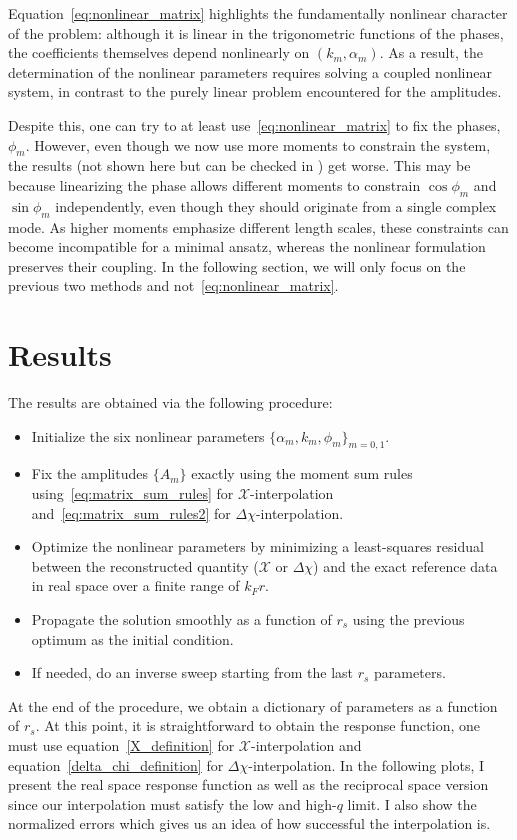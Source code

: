 \documentclass[aps,onecolumn]{revtex4-2}
\begin{document}
Equation~\eqref{eq:nonlinear_matrix} highlights the fundamentally nonlinear
character of the problem: although it is linear in the trigonometric functions
of the phases, the coefficients themselves depend nonlinearly on
$(k_m,\alpha_m)$. As a result, the determination of the nonlinear parameters
requires solving a coupled nonlinear system, in contrast to the purely linear
problem encountered for the amplitudes.

Despite this, one can try to at least use~\eqref{eq:nonlinear_matrix} to fix the phases, $\phi_m$. However, even though we now use more moments to constrain the system, the results (not shown here but can be checked in \cite{GUNES}) get worse. This may be because linearizing the phase allows different moments to constrain
$\cos\phi_m$ and $\sin\phi_m$ independently, even though they should originate
from a single complex mode. As higher moments emphasize different length scales,
these constraints can become incompatible for a minimal ansatz, whereas the
nonlinear formulation preserves their coupling. In the following section, we will only focus on the previous two methods and not~\eqref{eq:nonlinear_matrix}.



\section{Results}
\FloatBarrier
The results are obtained via the following procedure:
\begin{itemize}
    \item Initialize the six nonlinear parameters
          $\{\alpha_m,k_m,\phi_m\}_{m=0,1}$.
    \item Fix the amplitudes $\{A_m\}$ exactly using the moment sum rules using~\eqref{eq:matrix_sum_rules} for $\mathcal{X}$-interpolation and~\eqref{eq:matrix_sum_rules2} for $\Delta{\chi}$-interpolation.
    \item Optimize the nonlinear parameters by minimizing a least-squares
          residual between the reconstructed quantity ($\mathcal{X}$ or $\Delta{\chi}$) and the exact reference data in real space over a finite range of $k_F r$.
    \item Propagate the solution smoothly as a function of $r_s$ using the previous
          optimum as the initial condition.
    \item If needed, do an inverse sweep starting from the last $r_s$ parameters.
\end{itemize}
At the end of the procedure, we obtain a dictionary of parameters as a function of $r_s$. At this point, it is straightforward to obtain the response function, one must use equation~\eqref{X_definition} for $\mathcal{X}$-interpolation and equation~\eqref{delta_chi_definition} for $\Delta{\chi}$-interpolation. In the following plots, I present the real space response function as well as the reciprocal space version since our interpolation must satisfy the low and high-$q$ limit. I also show the normalized errors which gives us an idea of how successful the interpolation is.
\end{document}
